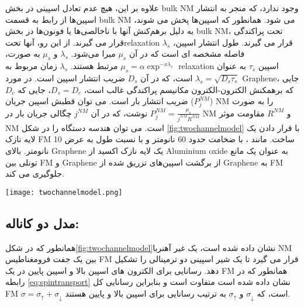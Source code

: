 علاوه بر این، هیچ عدم تعادل اسپینی در بخش \gls{bulk} \gls{NM} وجود ندارد، که منجر به انتشار اسپین‌ها از رابط به قسمت \gls{bulk} \gls{NM} می شود. همانطور که اسپین‌ها پخش می شوند، به دلیل برهم‌کنش آنها با ناخالصی‌ها یا فونون‌ها در بخش \gls{bulk} \gls{NM}، تحت پراکندگی قرار می گیرند. از این رو، آنها   تحت\gls{relaxation} قرار می گیرند. طول انتشار اسپین، $\lambda_s$ فاصله مشخصه ای است که در آن $\mu_s$ میرا می‌شود. $\lambda_s$ و $\mu_s$ به صورت، $\mu_s = \alpha\exp^{-x\lambda_s}$ مرتبط هستند. $\lambda_s$ زمان مربوط به \gls{relaxation} اسپین $\tau_s$ به عنوان $\lambda_s=\sqrt{D_s\tau_s}$ است، که در آن $D_s$ ضریب انتشار اسپین است. در مورد \gls{Graphene}، جایی که برهمکنش الکترون-الکترون مکانیسم پراکندگی غالب است، $D_s=D_c$، جایی که $D_c$ ضریب انتشار بار است. می توان قطبش اسپین جریان ($P_{j}^{NM}$) \gls{NM} را به صورت $P_{j}^{NM} = \frac{\mu_s}{j^{NM}R^{NM}}$ نوشت، که در آن $j^{NM}$ چگالی جریان بار در \gls{NM} و $R^{NM}$ مقاومت موثر \gls{NM} است.
می توان هندسه دستگاه را در شکل \ref{fig:twochannelmodel} با قرار دادن یک لایه نازک \gls{FM} ساخت. مانند ، با ضخامت حدود 60 نانومتر و با نسبت طول به عرض  10 نانومتر. بالای \gls{Graphene} یک لایه نازک اکسید از \gls{Aluminium oxide} به عنوان یک مانع تونلی بین \gls{FM} و \gls{Graphene} از برگشت اسپین‌های تزریق شده از \gls{Graphene} به \gls{FM} جلوگیری می کند.
\begin{figure*}[!ht]
    \centering
    \texttt{[image: twochannelmodel.png]}
    \caption{یک شیر اسپینی دو ترمینالی در شکل بالا با یک جفت  که یک  را ساندویچ می کند نشان داده شده است. شکل پایین مدل دو کاناله مربوطه را برای کانال اسپین بالا و پایین برای یک شیر اسپین دو ترمینالی نشان می دهد.}
    \label{fig:twochannelmodel}
\end{figure*}
\subsection{مدل دو کاناله:}
همانطور که در شکل\ref{fig:twochannelmodel}نشان داده شده است، یک غیر آهنربا \gls{NM} بین یک جفت فرومغناطیس \gls{FM} قرار می گیرد تا یک شیر اسپینی دو ترمینالی را تشکیل دهد. رسانایی برای الکترون های اسپین بالا و اسپین پایین در یک \gls{FM} همانطور که در رابطه \ref{eq:spintransport} نشان داده شده است متفاوت است و بنابراین رسانایی کل \gls{FM} $\sigma=\sigma_{\uparrow}+\sigma_{\downarrow}$ است، که $\sigma_{\downarrow}$ و $\sigma_{\uparrow}$ به ترتیب رسانایی برای اسپین بالا و پایین  هستند.

